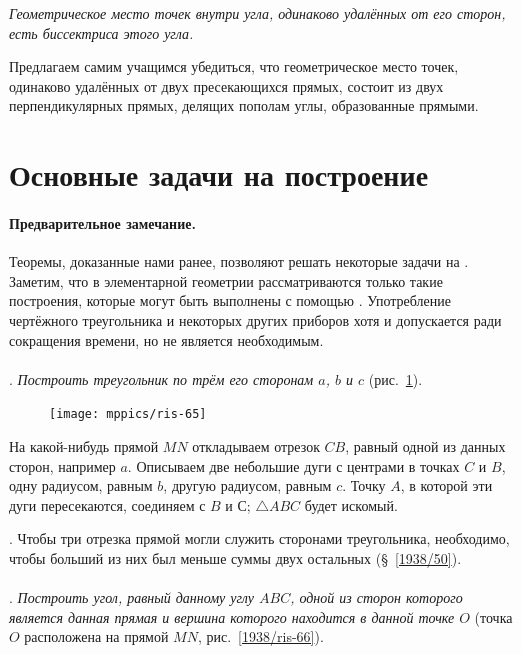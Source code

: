 \documentclass[oneside]{book}
\begin{document}
\emph{Геометрическое место точек внутри угла, одинаково удалённых от его сторон, есть биссектриса этого угла.}

Предлагаем самим учащимся убедиться, что геометрическое место точек, одинаково удалённых от двух пресекающихся прямых,
состоит из двух перпендикулярных прямых, делящих пополам углы, образованные прямыми.

\section{Основные задачи на построение}

\paragraph{Предварительное замечание.}\label{1938/61}
Теоремы, доказанные нами ранее, позволяют решать некоторые задачи на .
Заметим, что в элементарной геометрии рассматриваются только такие построения, которые могут быть выполнены с помощью .
Употребление чертёжного треугольника и некоторых других приборов хотя и допускается ради сокращения времени, но не является необходимым.

\paragraph{}\label{1938/62}
.
\emph{Построить треугольник по трём его сторонам $a$, $b$ и $c$} (рис.~\ref{1938/ris-65}).

\begin{figure}[h!]
\centering
\texttt{[image: mppics/ris-65]}
\caption{}\label{1938/ris-65}
\end{figure}

На какой-нибудь прямой $MN$ откладываем отрезок $CB$, равный одной из данных сторон, например $a$.
Описываем две небольшие дуги с центрами в точках $C$ и $B$, одну радиусом, равным $b$, другую радиусом, равным $c$.
Точку $A$, в которой эти дуги пересекаются, соединяем с $B$ и С;
$\triangle ABC$ будет искомый.

.
Чтобы три отрезка прямой могли служить сторонами треугольника, необходимо, чтобы больший из них был меньше суммы двух остальных (§~\ref{1938/50}). %

\paragraph{}\label{1938/63}
.
\emph{Построить угол, равный данному углу $ABC$, одной из сторон которого является данная прямая и вершина которого находится в данной точке $O$} (точка $O$ расположена на прямой $MN$, рис.~\ref{1938/ris-66}).
\end{document}
